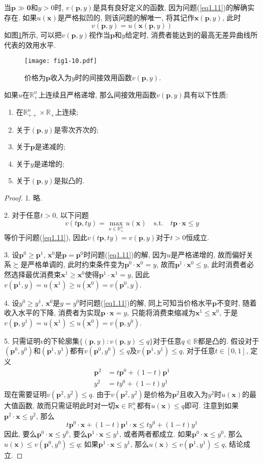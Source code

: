 \documentclass[cn, 12pt, math=mtpro2, bibstyle=apa, blue]{elegantbook}
\newcommand{\R}{\mathbb{R}}
\newcommand{\p}{\mathbf{p}}
\newcommand{\x}{\mathbf{x}}
\begin{document}
当$\p\gg\mathbf{0}$和$y>0$时, $v(\p,y)$是具有良好定义的函数, 因为问题(\ref{eq1.11})的解确实存在. 如果$u(\x)$是严格拟凹的, 则该问题的解唯一, 将其记作$\x(\p,y)$, 此时
$$v(\p,y)=u(\x(\p,y))$$
如图\ref{fig1.10}所示, 可以把$v(\p,y)$视作当$\p$和$y$给定时, 消费者能达到的最高无差异曲线所代表的效用水平.
\begin{figure}[htbp!]
  \centering
  \texttt{[image: fig1-10.pdf]}
  \caption{价格为$\p$收入为$y$时的间接效用函数$v(\p,y)$.}\label{fig1.10}
\end{figure}
\begin{theorem}[间接效用函数的性质]
  如果$u$在$\R_+^n$上连续且严格递增, 那么间接效用函数$v(\p,y)$具有以下性质:
  \begin{enumerate}[label=\arabic*.]
    \item 在$\R_{++}^n\times\R_+$上连续;
    \item 关于$(\p,y)$是零次齐次的;
    \item 关于$\p$是递减的;
    \item 关于$y$是递增的;
    \item 关于$(\p,y)$是拟凸的.
  \end{enumerate}
\end{theorem}
\begin{proof}
  1. 略.

  2. 对于任意$t>0$, 以下问题
  $$v(t\p,ty)=\max_{x\in\R_+^n}u(\x)\quad\text{s.t.}\quad t\p\cdot\x\leq y$$
  等价于问题(\ref{eq1.11}), 因此$v(t\p,ty)=v(\p,y)$对于$t>0$恒成立.

  3. 设$\p^0\ge\p^1$, $\x^0$是$\p=\p^0$时问题(\ref{eq1.11})的解, 因为$u$是严格递增的, 故而偏好关系$\succsim$是严格单调的, 此时约束条件变为$\p^0\cdot\x^0=y$, 故而$\p^1\cdot\x^0\leq y$, 此时消费者必然选择最优消费束$\x^1\ge \x^0$使得$\p^1\cdot\x^1=y$, 因此$v(\p^1,y)=u(\x^1)\geq u(\x^0)=v(\p^0,y)$.

  4. 设$y^0\ge y^1$, $\x^0$是$y=y^0$时问题(\ref{eq1.11})的解, 同上可知当价格水平$\p$不变时, 随着收入水平的下降, 消费者为实现$\p\cdot\x=y$, 只能将消费束缩减为$\x^1\leq \x^0$, 于是$v(\p,y^1)=u(\x^1)\leq u(\x^0)=v(\p,y^0)$.

  5. 只需证明$v$的下轮廓集$\{(\p,y):v(\p,y)\leq q\}$对于任意$q\in\R$都是凸的. 假设对于$(\p^0,y^0)$和$(\p^1,y^1)$都有$v(\p^0,y^0)\leq q$及$v(\p^1,y^1)\leq q$, 对于任意$t\in[0,1]$, 定义
  \begin{align*}
  \p^2&=t\p^0+(1-t)\p^1 \\
  y^2&=ty^0+(1-t)y^1
  \end{align*}
  现在需要证明$v(\p^2,y^2)\leq q$. 由于$v(\p^2,y^2)$是价格为$\p^2$且收入为$y^2$时$u(\x)$的最大值函数, 故而只需证明此时对一切$\x\in\R_+^n$都有$u(\x)\leq q$即可. 注意到如果$\p^2\cdot\x\leq y^2$, 那么
  $$t\p^0\cdot\x+(1-t)\p^1\cdot\x\leq ty^0+(1-t)y^1$$
  因此, 要么$\p^0\cdot \x\leq y^0$, 要么$\p^1\cdot\x\leq y^1$, 或者两者都成立. 如果$\p^0\cdot \x\leq y^0$, 那么$u(\x)\leq v(\p^0,y^0)\leq q$; 如果$\p^1\cdot\x\leq y^1$, 那么$u(\x)\leq v(\p^1,y^1)\leq q$, 结论成立.

\end{proof}
\end{document}
